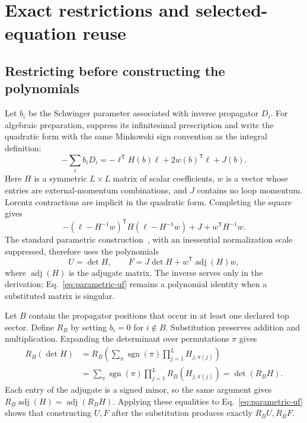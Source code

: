 \section{Exact restrictions and selected-equation reuse}
\label{app:parametric}
\subsection{Restricting before constructing the polynomials}
Let $b_i$ be the Schwinger parameter associated with inverse propagator $D_i$. For algebraic preparation, suppress its infinitesimal prescription and write the quadratic form with the same Minkowski sign convention as the integral definition:
\begin{equation}
-\sum_i b_iD_i=-\boldsymbol\ell^{\mathsf T}H(b)\boldsymbol\ell
 +2w(b)^{\mathsf T}\boldsymbol\ell+J(b).
\end{equation}
Here $H$ is a symmetric $L\times L$ matrix of scalar coefficients, $w$ is a vector whose entries are external-momentum combinations, and $J$ contains no loop momentum. Lorentz contractions are implicit in the quadratic form. Completing the square gives
\begin{equation}
-(\boldsymbol\ell-H^{-1}w)^{\mathsf T}H(\boldsymbol\ell-H^{-1}w)
 +J+w^{\mathsf T}H^{-1}w.
\end{equation}
The standard parametric construction~\cite{BognerWeinzierl2010}, with an inessential normalization scale suppressed, therefore uses the polynomials
\begin{equation}
U=\det H,\qquad F=J\det H+w^{\mathsf T}\operatorname{adj}(H)w,
\label{eq:parametric-uf}
\end{equation}
where $\operatorname{adj}(H)$ is the adjugate matrix. The inverse serves only in the derivation; Eq.~\eqref{eq:parametric-uf} remains a polynomial identity when a substituted matrix is singular.

Let $B$ contain the propagator positions that occur in at least one declared top sector. Define $R_B$ by setting $b_i=0$ for $i\notin B$. Substitution preserves addition and multiplication. Expanding the determinant over permutations $\pi$ gives
\begin{align}
R_B(\det H)
 &=R_B\left(\sum_{\pi}\operatorname{sgn}(\pi)\prod_{j=1}^L H_{j,\pi(j)}\right)\\
 &=\sum_{\pi}\operatorname{sgn}(\pi)\prod_{j=1}^L R_B(H_{j,\pi(j)})
 =\det(R_BH).
\end{align}
Each entry of the adjugate is a signed minor, so the same argument gives
$R_B\operatorname{adj}(H)=\operatorname{adj}(R_BH)$. Applying these equalities to Eq.~\eqref{eq:parametric-uf} shows that constructing $U,F$ after the substitution produces exactly $R_BU,R_BF$.

